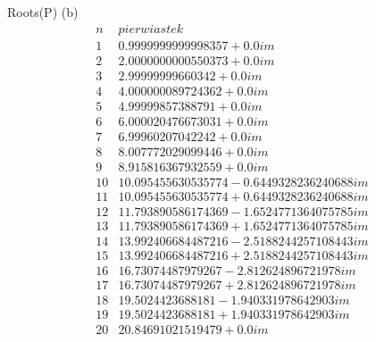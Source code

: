 Roots(P) (b)
$$
\begin{array}{c|c}
n & pierwiastek\\
\hline
1 & 0.9999999999998357 + 0.0im\\
2 & 2.0000000000550373 + 0.0im\\
3 & 2.99999999660342 + 0.0im\\
4 & 4.000000089724362 + 0.0im\\
5 & 4.99999857388791 + 0.0im\\
6 & 6.000020476673031 + 0.0im\\
7 & 6.99960207042242 + 0.0im\\
8 & 8.007772029099446 + 0.0im\\
9 & 8.915816367932559 + 0.0im\\
10 & 10.095455630535774 - 0.6449328236240688im\\
11 & 10.095455630535774 + 0.6449328236240688im\\
12 & 11.793890586174369 - 1.6524771364075785im\\
13 & 11.793890586174369 + 1.6524771364075785im\\
14 & 13.992406684487216 - 2.5188244257108443im\\
15 & 13.992406684487216 + 2.5188244257108443im\\
16 & 16.73074487979267 - 2.812624896721978im\\
17 & 16.73074487979267 + 2.812624896721978im\\
18 & 19.5024423688181 - 1.940331978642903im\\
19 & 19.5024423688181 + 1.940331978642903im\\
20 & 20.84691021519479 + 0.0im\\
\end{array}
$$
